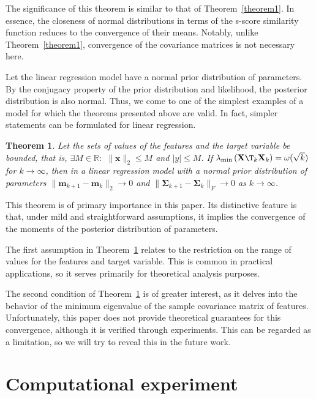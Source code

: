 \documentclass[sn-mathphys-num]{sn-jnl}%
\newtheorem{theorem}{Theorem}%
\begin{document}
The significance of this theorem is similar to that of Theorem~\ref{theorem1}. In essence, the closeness of normal distributions in terms of the s-score similarity function reduces to the convergence of their means. Notably, unlike Theorem~\ref{theorem1}, convergence of the covariance matrices is not necessary here.

Let the linear regression model have a normal prior distribution of parameters. By the conjugacy property of the prior distribution and likelihood, the posterior distribution is also normal. Thus, we come to one of the simplest examples of a model for which the theorems presented above are valid. In fact, simpler statements can be formulated for linear regression.

\begin{theorem}\label{theorem3}
    Let the sets of values of the features and the target variable be bounded, that is, $\exists M\in \mathbb{R}:$ $\|\mathbf{x}\|_2\leqslant M$ and $|y|\leqslant M$. If $\lambda_{\min}\left(\mathbf{X}\T_k \mathbf{X}_k \right) = \omega(\sqrt{k})$ for $k\to \infty$, then in a linear regression model with a normal prior distribution of parameters $\|\mathbf{m}_{k+1} - \mathbf{m}_k\|_2\to 0$ and $\|\mathbf{\Sigma}_{k+1} - \mathbf{\Sigma}_k\|_{F}\to 0$ as $k\to \infty$.
\end{theorem}

This theorem is of primary importance in this paper. Its distinctive feature is that, under mild and straightforward assumptions, it implies the convergence of the moments of the posterior distribution of parameters.

The first assumption in Theorem~\ref{theorem3} relates to the restriction on the range of values for the features and target variable. This is common in practical applications, so it serves primarily for theoretical analysis purposes.

The second condition of Theorem~\ref{theorem3} is of greater interest, as it delves into the behavior of the minimum eigenvalue of the sample covariance matrix of features. Unfortunately, this paper does not provide theoretical guarantees for this convergence, although it is verified through experiments. This can be regarded as a limitation, so we will try to reveal this in the future work.

\section{Computational experiment}
\end{document}
